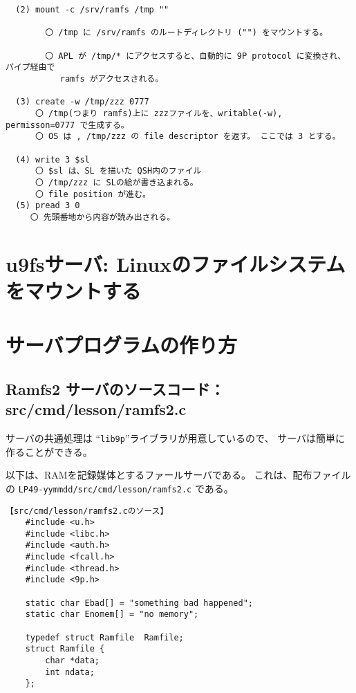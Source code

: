 {\begin{verbatim}
  (2) mount -c /srv/ramfs /tmp "" 

        〇 /tmp に /srv/ramfs のルートディレクトリ ("") をマウントする。
    
        〇 APL が /tmp/* にアクセスすると、自動的に 9P protocol に変換され、パイプ経由で
           ramfs がアクセスされる。
    
  (3) create -w /tmp/zzz 0777
      〇 /tmp(つまり ramfs)上に zzzファイルを、writable(-w), permisson=0777 で生成する。
      〇 OS は , /tmp/zzz の file descriptor を返す。 ここでは 3 とする。
    
  (4) write 3 $sl
      〇 $sl は、SL を描いた QSH内のファイル   
      〇 /tmp/zzz に SLの絵が書き込まれる。
      〇 file position が進む。
  (5) pread 3 0
     〇 先頭番地から内容が読み出される。
\end{verbatim}          


\chapter{u9fsサーバ: Linuxのファイルシステムをマウントする}

\vspace{4cm}




\chapter{サーバプログラムの作り方}

\section{Ramfs2 サーバのソースコード： src/cmd/lesson/ramfs2.c}

サーバの共通処理は ``{\tt lib9p}''ライブラリが用意しているので、
サーバは簡単に作ることができる。

以下は、RAMを記録媒体とするファールサーバである。
これは、配布ファイルの {\tt LP49-yymmdd/src/cmd/lesson/ramfs2.c} である。


{\footnotesize
\begin{verbatim}
【src/cmd/lesson/ramfs2.cのソース】
    #include <u.h>
    #include <libc.h>
    #include <auth.h>
    #include <fcall.h>
    #include <thread.h>
    #include <9p.h>

    static char Ebad[] = "something bad happened";
    static char Enomem[] = "no memory";

    typedef struct Ramfile	Ramfile;
    struct Ramfile {
        char *data;
        int ndata;
    };


\end{verbatim}}}
